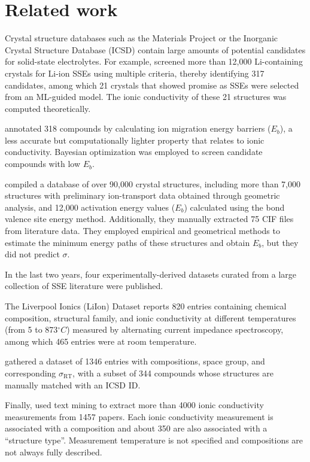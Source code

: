 \section{Related work}
\label{sec:relatedwork}

Crystal structure databases such as the Materials Project \cite{jain2013commentary} or the Inorganic Crystal Structure Database (ICSD) \cite{belsky2002new,hellenbrandt2004inorganic} contain large amounts of potential candidates for solid-state electrolytes. For example, \citet{sendek2017holistic} screened more than 12,000 Li-containing crystals for Li-ion SSEs using multiple criteria, thereby identifying 317 candidates, among which 21 crystals that showed promise as SSEs were selected from an ML-guided model. The ionic conductivity of these 21 structures was computed theoretically.

\citet{jalem2018bayesian} annotated 318 compounds by calculating ion migration energy barriers ($E_b$), a less accurate but computationally lighter property that relates to ionic conductivity. Bayesian optimization was employed to screen candidate compounds with low $E_b$.

\citet{he2020high} compiled a database of over 90,000 crystal structures, including more than 7,000 structures with preliminary ion-transport data obtained through geometric analysis, and 12,000 activation energy values ($E_b$) calculated using the bond valence site energy method. Additionally, they manually extracted 75 CIF files from literature data. They employed empirical and geometrical methods to estimate the minimum energy paths of these structures and obtain $E_b$, but they did not predict $\sigma$.

In the last two years, four experimentally-derived datasets curated from a large collection of SSE literature were published. 

The Liverpool Ionics (LiIon) Dataset \cite{hargreaves2023database} reports 820 entries containing chemical composition, structural family, and ionic conductivity at different temperatures (from 5 to 873$^\circ C$) measured by alternating current impedance spectroscopy, among which 465 entries were at room temperature.

\citet{laskowski2023identification} gathered a dataset of 1346 entries with compositions, space group, and corresponding $\sigma_{\text{RT}}$, with a subset of 344 compounds whose structures are manually matched with an ICSD ID. 

Finally, \citet{shon2023extracting} used text mining to extract more than 4000 ionic conductivity measurements from 1457 papers. Each ionic conductivity measurement is associated with a composition and about 350 are also associated with a ``structure type''. Measurement temperature is not specified and compositions are not always fully described.

